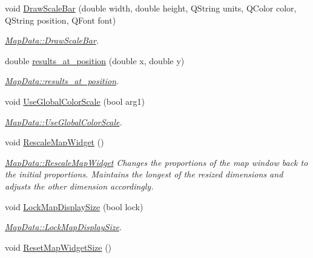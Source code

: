 \begin{DoxyCompactItemize}
\item 
void \hyperlink{class_map_data_addb50d1d449353343157ab45d6d96c1a}{Draw\+Scale\+Bar} (double width, double height, Q\+String units, Q\+Color color, Q\+String position, Q\+Font font)
\begin{DoxyCompactList}\small\item\em \hyperlink{class_map_data_addb50d1d449353343157ab45d6d96c1a}{Map\+Data\+::\+Draw\+Scale\+Bar}. \end{DoxyCompactList}\item 
double \hyperlink{class_map_data_ad209dc0ec9935f2d551867af307594d0}{results\+\_\+at\+\_\+position} (double x, double y)
\begin{DoxyCompactList}\small\item\em \hyperlink{class_map_data_ad209dc0ec9935f2d551867af307594d0}{Map\+Data\+::results\+\_\+at\+\_\+position}. \end{DoxyCompactList}\item 
void \hyperlink{class_map_data_af30cb1a76812d7904c1f571a8e1fe1e4}{Use\+Global\+Color\+Scale} (bool arg1)
\begin{DoxyCompactList}\small\item\em \hyperlink{class_map_data_af30cb1a76812d7904c1f571a8e1fe1e4}{Map\+Data\+::\+Use\+Global\+Color\+Scale}. \end{DoxyCompactList}\item 
void \hyperlink{class_map_data_acdaa2f55e2cbf4ad03582b3d1bc99c2e}{Rescale\+Map\+Widget} ()\hypertarget{class_map_data_acdaa2f55e2cbf4ad03582b3d1bc99c2e}{}\label{class_map_data_acdaa2f55e2cbf4ad03582b3d1bc99c2e}

\begin{DoxyCompactList}\small\item\em \hyperlink{class_map_data_acdaa2f55e2cbf4ad03582b3d1bc99c2e}{Map\+Data\+::\+Rescale\+Map\+Widget} Changes the proportions of the map window back to the initial proportions. Maintains the longest of the resized dimensions and adjusts the other dimension accordingly. \end{DoxyCompactList}\item 
void \hyperlink{class_map_data_a980161f78d12c23787f6593e0ea79282}{Lock\+Map\+Display\+Size} (bool lock)
\begin{DoxyCompactList}\small\item\em \hyperlink{class_map_data_a980161f78d12c23787f6593e0ea79282}{Map\+Data\+::\+Lock\+Map\+Display\+Size}. \end{DoxyCompactList}\item 
void \hyperlink{class_map_data_a795493559eec5070c21ba9561af583d9}{Reset\+Map\+Widget\+Size} ()\hypertarget{class_map_data_a795493559eec5070c21ba9561af583d9}{}\label{class_map_data_a795493559eec5070c21ba9561af583d9}


\end{DoxyCompactItemize}
